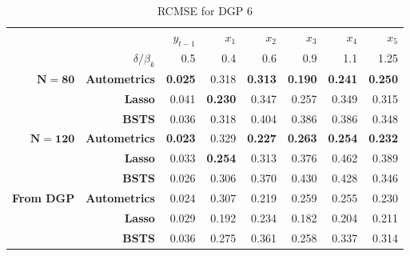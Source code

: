 \begin{table}[htbp]
  \centering

    \begin{tabular}{r|r|rrrrrr}
  
          &       & $y_{t-1}$ & $x_{1}$ & $x_{2}$ & $x_{3}$ & $x_{4}$ & $x_{5}$ \\

          &   $\delta/\beta_{k} $   & 0.5 & 0.4&0.6 &0.9&1.1  &1.25  \\
          \hline
    $\bm{N=80}$ & \textbf{Autometrics} & \textbf{0.025} & 0.318 & \textbf{0.313} & \textbf{0.190} & \textbf{0.241} & \textbf{0.250} \\
    \textbf{} & \textbf{Lasso} & 0.041 & \textbf{0.230} & 0.347 & 0.257 & 0.349 & 0.315 \\
    \textbf{} & \textbf{BSTS} & 0.036 & 0.318 & 0.404 & 0.386 & 0.386 & 0.348 \\
    \hline
    $\bm{N=120}$ & \textbf{Autometrics} & \textbf{0.023} & 0.329 & \textbf{0.227} & \textbf{0.263} & \textbf{0.254} & \textbf{0.232} \\
    \textbf{} & \textbf{Lasso} & 0.033 & \textbf{0.254 }& 0.313 & 0.376 & 0.462 & 0.389 \\
    \textbf{} & \textbf{BSTS} & 0.026 & 0.306 & 0.370 & 0.430 & 0.428 & 0.346 \\
    \hline
    \textbf{From DGP} & \textbf{Autometrics} & 0.024 & 0.307 & 0.219 & 0.259 & 0.255 & 0.230 \\
          & \textbf{Lasso} & 0.029 & 0.192 & 0.234 & 0.182 & 0.204 & 0.211\\
          & \textbf{BSTS} & 0.036 & 0.275 & 0.361 & 0.258 & 0.337 & 0.314 \\
 
    \end{tabular}%
      \caption{RCMSE for DGP 6}
  \label{DGP6CMSE}%
\end{table}%


